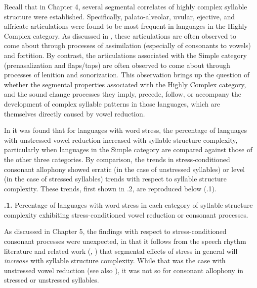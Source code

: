   Recall that in Chapter 4, several segmental correlates of highly complex syllable structure were established. Specifically, palato-alveolar, uvular, ejective, and affricate articulations were found to be most frequent in languages in the Highly Complex category. As discussed in , these articulations are often observed to come about through processes of assimilation (especially of consonants to vowels) and fortition. By contrast, the articulations associated with the Simple category (prenasalization and flaps/taps) are often observed to come about through processes of lenition and sonorization. This observation brings up the question of whether the segmental properties associated with the Highly Complex category, and the sound change processes they imply, precede, follow, or accompany the development of complex syllable patterns in those languages, which are themselves directly caused by vowel reduction.

  In  it was found that for languages with word stress, the percentage of languages with unstressed vowel reduction increased with syllable structure complexity, particularly when languages in the Simple category are compared against those of the other three categories. By comparison, the trends in stress-conditioned consonant allophony showed erratic (in the case of unstressed syllables) or level (in the case of stressed syllables) trends with respect to syllable structure complexity. These trends, first shown in .2, are reproduced below (.1).

\textbf{.1.} Percentage of languages with word stress in each category of syllable structure complexity exhibiting stress-conditioned vowel reduction or consonant processes.

As discussed in Chapter 5, the findings with respect to stress-conditioned consonant processes were unexpected, in that it follows from the speech rhythm literature and related work (\citealt{BybeeEtAl1998}, \citealt{Schiering2007}) that segmental effects of stress in general will \textit{increase} with syllable structure complexity. While that was the case with unstressed vowel reduction (see also ), it was not so for consonant allophony in stressed or unstressed syllables.

